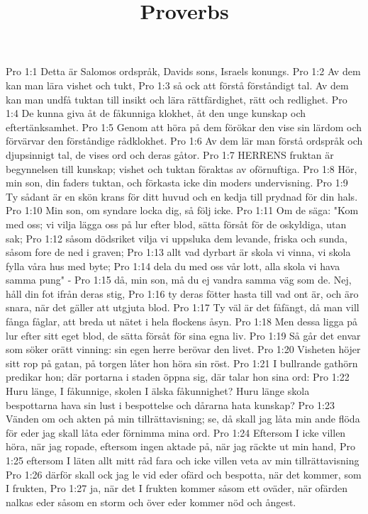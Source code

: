 

\title{Proverbs}

Pro 1:1  Detta är Salomos ordspråk, Davids sons, Israels konungs.
Pro 1:2  Av dem kan man lära vishet och tukt,
Pro 1:3  så ock att förstå förståndigt tal. Av dem kan man undfå tuktan till insikt och lära rättfärdighet, rätt och redlighet.
Pro 1:4  De kunna giva åt de fåkunniga klokhet, åt den unge kunskap och eftertänksamhet.
Pro 1:5  Genom att höra på dem förökar den vise sin lärdom och förvärvar den förståndige rådklokhet.
Pro 1:6  Av dem lär man förstå ordspråk och djupsinnigt tal, de vises ord och deras gåtor.
Pro 1:7  HERRENS fruktan är begynnelsen till kunskap; vishet och tuktan föraktas av oförnuftiga.
Pro 1:8  Hör, min son, din faders tuktan, och förkasta icke din moders undervisning.
Pro 1:9  Ty sådant är en skön krans för ditt huvud och en kedja till prydnad för din hals.
Pro 1:10  Min son, om syndare locka dig, så följ icke.
Pro 1:11  Om de säga: "Kom med oss; vi vilja lägga oss på lur efter blod, sätta försåt för de oskyldiga, utan sak;
Pro 1:12  såsom dödsriket vilja vi uppsluka dem levande, friska och sunda, såsom fore de ned i graven;
Pro 1:13  allt vad dyrbart är skola vi vinna, vi skola fylla våra hus med byte;
Pro 1:14  dela du med oss vår lott, alla skola vi hava samma pung" -
Pro 1:15  då, min son, må du ej vandra samma väg som de. Nej, håll din fot ifrån deras stig,
Pro 1:16  ty deras fötter hasta till vad ont är, och äro snara, när det gäller att utgjuta blod.
Pro 1:17  Ty väl är det fåfängt, då man vill fånga fåglar, att breda ut nätet i hela flockens åsyn.
Pro 1:18  Men dessa ligga på lur efter sitt eget blod, de sätta försåt för sina egna liv.
Pro 1:19  Så går det envar som söker orätt vinning: sin egen herre berövar den livet.
Pro 1:20  Visheten höjer sitt rop på gatan, på torgen låter hon höra sin röst.
Pro 1:21  I bullrande gathörn predikar hon; där portarna i staden öppna sig, där talar hon sina ord:
Pro 1:22  Huru länge, I fåkunnige, skolen I älska fåkunnighet? Huru länge skola bespottarna hava sin lust i bespottelse och dårarna hata kunskap?
Pro 1:23  Vänden om och akten på min tillrättavisning; se, då skall jag låta min ande flöda för eder jag skall låta eder förnimma mina ord.
Pro 1:24  Eftersom I icke villen höra, när jag ropade, eftersom ingen aktade på, när jag räckte ut min hand,
Pro 1:25  eftersom I läten allt mitt råd fara och icke villen veta av min tillrättavisning
Pro 1:26  därför skall ock jag le vid eder ofärd och bespotta, när det kommer, som I frukten,
Pro 1:27  ja, när det I frukten kommer såsom ett oväder, när ofärden nalkas eder såsom en storm och över eder kommer nöd och ångest.
